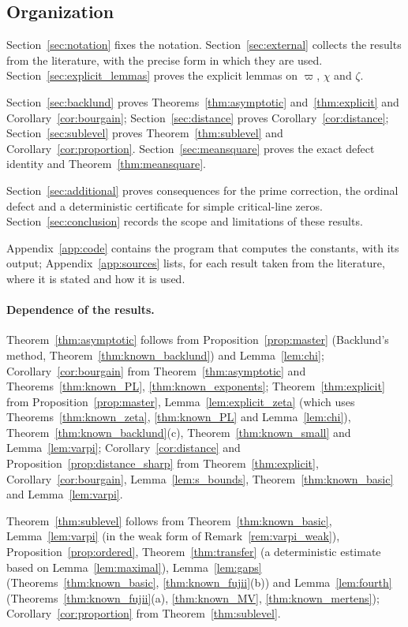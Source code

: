 \documentclass[11pt,a4paper]{article}
\makeatletter
\numberwithin{equation}{section}
\DeclareRobustCommand{\CGref}[1]{\ref{#1}}
\let\CG@origref\ref
\newcommand{\CG@gettip}[1]{\@ifundefined{CGTip@#1}{#1}{\csname CGTip@#1\endcsname}}
\DeclareRobustCommand{\CGref}[1]{\pdftooltip{\CG@origref{#1}}{\CG@gettip{#1}}}
\theoremstyle{definition}
\theoremstyle{remark}
\makeatother
\begin{document}
\subsection{Organization}
Section~\CGref{sec:notation} fixes the notation. Section~\CGref{sec:external} collects the results from the literature, with the precise form in which they are used. Section~\CGref{sec:explicit_lemmas} proves the explicit lemmas on $\varpi$, $\chi$ and $\zeta$.

Section~\CGref{sec:backlund} proves Theorems~\CGref{thm:asymptotic} and~\CGref{thm:explicit} and Corollary~\CGref{cor:bourgain}; Section~\CGref{sec:distance} proves Corollary~\CGref{cor:distance}; Section~\CGref{sec:sublevel} proves Theorem~\CGref{thm:sublevel} and Corollary~\CGref{cor:proportion}. Section~\CGref{sec:meansquare} proves the exact defect identity and Theorem~\CGref{thm:meansquare}.

Section~\CGref{sec:additional} proves consequences for the prime correction, the ordinal defect and a deterministic certificate for simple critical-line zeros. Section~\CGref{sec:conclusion} records the scope and limitations of these results.

Appendix~\CGref{app:code} contains the program that computes the constants, with its output; Appendix~\CGref{app:sources} lists, for each result taken from the literature, where it is stated and how it is used.

\paragraph{Dependence of the results.}
Theorem~\CGref{thm:asymptotic} follows from Proposition~\CGref{prop:master} (Backlund's method, Theorem~\CGref{thm:known_backlund}) and Lemma~\CGref{lem:chi}; Corollary~\CGref{cor:bourgain} from Theorem~\CGref{thm:asymptotic} and Theorems~\CGref{thm:known_PL}, \CGref{thm:known_exponents}; Theorem~\CGref{thm:explicit} from Proposition~\CGref{prop:master}, Lemma~\CGref{lem:explicit_zeta} (which uses Theorems~\CGref{thm:known_zeta}, \CGref{thm:known_PL} and Lemma~\CGref{lem:chi}), Theorem~\CGref{thm:known_backlund}(c), Theorem~\CGref{thm:known_small} and Lemma~\CGref{lem:varpi}; Corollary~\CGref{cor:distance} and Proposition~\CGref{prop:distance_sharp} from Theorem~\CGref{thm:explicit}, Corollary~\CGref{cor:bourgain}, Lemma~\CGref{lem:s_bounds}, Theorem~\CGref{thm:known_basic} and Lemma~\CGref{lem:varpi}.

Theorem~\CGref{thm:sublevel} follows from Theorem~\CGref{thm:known_basic}, Lemma~\CGref{lem:varpi} (in the weak form of Remark~\CGref{rem:varpi_weak}), Proposition~\CGref{prop:ordered}, Theorem~\CGref{thm:transfer} (a deterministic estimate based on Lemma~\CGref{lem:maximal}), Lemma~\CGref{lem:gaps} (Theorems~\CGref{thm:known_basic}, \CGref{thm:known_fujii}(b)) and Lemma~\CGref{lem:fourth} (Theorems~\CGref{thm:known_fujii}(a), \CGref{thm:known_MV}, \CGref{thm:known_mertens}); Corollary~\CGref{cor:proportion} from Theorem~\CGref{thm:sublevel}.
\end{document}
